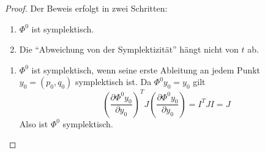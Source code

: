 \begin{proof}
	Der Beweis erfolgt in zwei Schritten:
	\begin{enumerate}
		\item $\Phi^0$ ist symplektisch.
		\item Die \enquote{Abweichung von der Symplektizität} hängt nicht von $t$ ab.
	\end{enumerate}
	
	\begin{enumerate}[label=(zu \arabic*), leftmargin=*]
		\item $\Phi^0$ ist symplektisch, wenn seine erste Ableitung an jedem Punkt $y_0 = (p_0, q_0)$ symplektisch ist. Da $\Phi^0 y_0 = y_0$ gilt
		\begin{equation*}
			\left( \frac{\partial \Phi^0 y_0}{\partial y_0} \right)^T J \left( \frac{\partial \Phi^0 y_0}{\partial y_0} \right)
			= I^T J I
			= J
		\end{equation*}
		Also ist $\Phi^0$ symplektisch.
		

\end{enumerate}
\end{proof}
